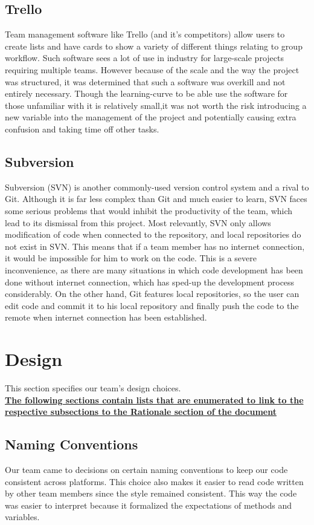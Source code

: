 \documentclass[12pt]{report}
\begin{document}
	\subsection{Trello}
		Team management software like Trello (and it's competitors) allow users to create lists and
		have cards to show a variety of different things relating to group workflow. Such software
		sees a lot of use in industry for large-scale projects requiring multiple teams. However
		because of the scale and the way the project was structured, it was determined that such a
		software was overkill and not entirely necessary. Though the learning-curve to be able use
		the software for those unfamiliar with it is relatively small,it was not worth the risk
		introducing a new variable into the management of the project and potentially causing extra
		confusion and taking time off other tasks.
	\subsection{Subversion}
	Subversion (SVN) is another commonly-used version control system and a rival to Git. Although it
	is far less complex than Git and much easier to learn, SVN faces some serious problems that
	would inhibit the productivity of the team, which lead to its dismissal from this project. Most
	relevantly, SVN only allows modification of code when connected to the repository, and local
	repositories do not exist in SVN. This means that if a team member has no internet connection,
	it would be impossible for him to work on the code. This is a severe inconvenience, as there are
	many situations in which code development has been done without internet connection, which has
	sped-up the development process considerably. On the other hand, Git features local
	repositories, so the user can edit code and commit it to his local repository and finally push
	the code to the remote when internet connection has been established.

\section{Design}
\label{s:integration-design}
This section specifies our team's design choices.\\

\textbf{ \hyperref[s:integration-rationale]{The following sections contain lists that are enumerated
to link to the respective subsections to the Rationale section of the document}}

\subsection{Naming Conventions}
Our team came to decisions on certain naming conventions to keep our code consistent across
platforms. This choice also makes it easier to read code written by other team members since the
style remained consistent. This way the code was easier to interpret because it formalized the
expectations of methods and variables. \\
\end{document}
